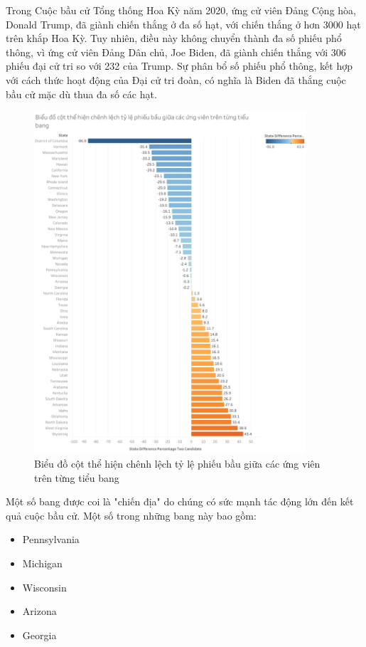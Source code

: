 \documentclass[14pt, a4paper]{article}
\numberwithin{equation}{section}
\numberwithin{figure}{section}
\numberwithin{dl}{section}
\numberwithin{md}{section}
\numberwithin{bd}{section}
\numberwithin{dn}{section}
\numberwithin{hq}{section}
\begin{document}
    Trong Cuộc bầu cử Tổng thống Hoa Kỳ năm 2020, ứng cử viên Đảng Cộng hòa, Donald Trump, đã giành chiến thắng ở đa số hạt, với chiến thắng ở hơn 3000 hạt trên khắp Hoa Kỳ. 
    Tuy nhiên, điều này không chuyển thành đa số phiếu phổ thông, vì ứng cử viên Đảng Dân chủ, Joe Biden, đã giành chiến thắng với 306 phiếu đại cử tri so với 232 của Trump. 
    Sự phân bổ số phiếu phổ thông, kết hợp với cách thức hoạt động của Đại cử tri đoàn, có nghĩa là Biden đã thắng cuộc bầu cử mặc dù thua đa số các hạt.

    \begin{figure}[h!]
        \centering
        \includegraphics[width=0.9\textwidth]{figures/State_Difference_Percentage_Total_Vote_Two_Candidate_Bar_Chart.png}
        \caption{Biểu đồ cột thể hiện chênh lệch tỷ lệ phiếu bầu giữa các ứng viên trên từng tiểu bang}
    \end{figure}

    Một số bang được coi là "chiến địa" do chúng có sức mạnh tác động lớn đến kết quả cuộc bầu cử. 
    Một số trong những bang này bao gồm:

    \begin{itemize}
        \item Pennsylvania
        \item Michigan
        \item Wisconsin
        \item Arizona
        \item Georgia
    \end{itemize}
\end{document}
